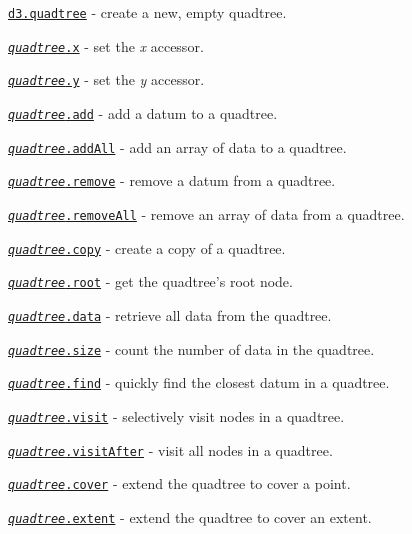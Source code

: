 \begin{DoxyItemize}
\item \href{https://github.com/d3/d3-quadtree/blob/master/README.md#quadtree}{\tt d3.\+quadtree} -\/ create a new, empty quadtree.
\item \href{https://github.com/d3/d3-quadtree/blob/master/README.md#quadtree_x}{\tt {\itshape quadtree}.x} -\/ set the {\itshape x} accessor.
\item \href{https://github.com/d3/d3-quadtree/blob/master/README.md#quadtree_y}{\tt {\itshape quadtree}.y} -\/ set the {\itshape y} accessor.
\item \href{https://github.com/d3/d3-quadtree/blob/master/README.md#quadtree_add}{\tt {\itshape quadtree}.add} -\/ add a datum to a quadtree.
\item \href{https://github.com/d3/d3-quadtree/blob/master/README.md#quadtree_addAll}{\tt {\itshape quadtree}.add\+All} -\/ add an array of data to a quadtree.
\item \href{https://github.com/d3/d3-quadtree/blob/master/README.md#quadtree_remove}{\tt {\itshape quadtree}.remove} -\/ remove a datum from a quadtree.
\item \href{https://github.com/d3/d3-quadtree/blob/master/README.md#quadtree_removeAll}{\tt {\itshape quadtree}.remove\+All} -\/ remove an array of data from a quadtree.
\item \href{https://github.com/d3/d3-quadtree/blob/master/README.md#quadtree_copy}{\tt {\itshape quadtree}.copy} -\/ create a copy of a quadtree.
\item \href{https://github.com/d3/d3-quadtree/blob/master/README.md#quadtree_root}{\tt {\itshape quadtree}.root} -\/ get the quadtree’s root node.
\item \href{https://github.com/d3/d3-quadtree/blob/master/README.md#quadtree_data}{\tt {\itshape quadtree}.data} -\/ retrieve all data from the quadtree.
\item \href{https://github.com/d3/d3-quadtree/blob/master/README.md#quadtree_size}{\tt {\itshape quadtree}.size} -\/ count the number of data in the quadtree.
\item \href{https://github.com/d3/d3-quadtree/blob/master/README.md#quadtree_find}{\tt {\itshape quadtree}.find} -\/ quickly find the closest datum in a quadtree.
\item \href{https://github.com/d3/d3-quadtree/blob/master/README.md#quadtree_visit}{\tt {\itshape quadtree}.visit} -\/ selectively visit nodes in a quadtree.
\item \href{https://github.com/d3/d3-quadtree/blob/master/README.md#quadtree_visitAfter}{\tt {\itshape quadtree}.visit\+After} -\/ visit all nodes in a quadtree.
\item \href{https://github.com/d3/d3-quadtree/blob/master/README.md#quadtree_cover}{\tt {\itshape quadtree}.cover} -\/ extend the quadtree to cover a point.
\item \href{https://github.com/d3/d3-quadtree/blob/master/README.md#quadtree_extent}{\tt {\itshape quadtree}.extent} -\/ extend the quadtree to cover an extent.
\end{DoxyItemize}

